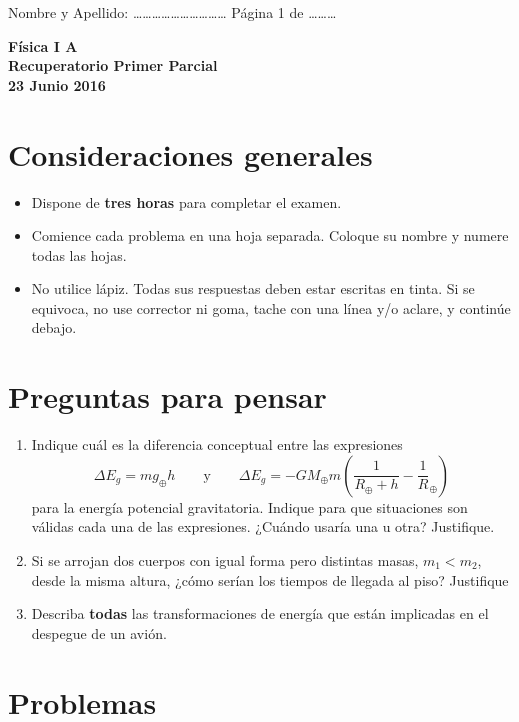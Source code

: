 \documentclass[a4paper,12pt]{article}
\begin{document}
\pagestyle{empty}
Nombre y Apellido: \ldots\ldots\ldots\ldots\ldots\ldots\ldots\ldots\ldots\ldots
Página 1 de \ldots\ldots\ldots \begin{center}
{\Large {\bf{Física I A}}} \\
\bigskip
{\large {\bf{Recuperatorio Primer Parcial}}} \\ {\bf{23 Junio 2016}} \\
\end{center}

\section{Consideraciones generales}

\begin{itemize}
	\item Dispone de {\bf{tres horas}} para completar el examen.
	\item Comience cada problema en una hoja separada. Coloque su nombre y
		numere todas las hojas.  
	\item No utilice lápiz. Todas sus respuestas deben estar escritas en tinta.
		Si se equivoca, no use corrector ni goma, tache con una línea y/o
		aclare, y continúe debajo.
\end{itemize}

\section{Preguntas para pensar}

\begin{enumerate}
	\item Indique cuál es la diferencia conceptual entre las expresiones
		$$\Delta E_g=m g_\oplus h \qquad \mathrm{y} \qquad \Delta E_g = -G
		M_\oplus m \left (\frac{1}{R_\oplus + h} - \frac1R_\oplus \right )$$
		para la energía potencial gravitatoria.  Indique para que situaciones
		son válidas cada una de las expresiones.  ¿Cuándo usaría una u otra?
		Justifique. 
	\item Si se arrojan dos cuerpos con igual forma pero distintas masas,
		$m_1<m_2$, desde la misma altura, ¿cómo serían los tiempos de llegada
		al piso? Justifique
	\item Describa {\bf{todas}} las transformaciones de energía que están
		implicadas en el despegue de un avión.
\end{enumerate}

\section{Problemas}
\end{document}
